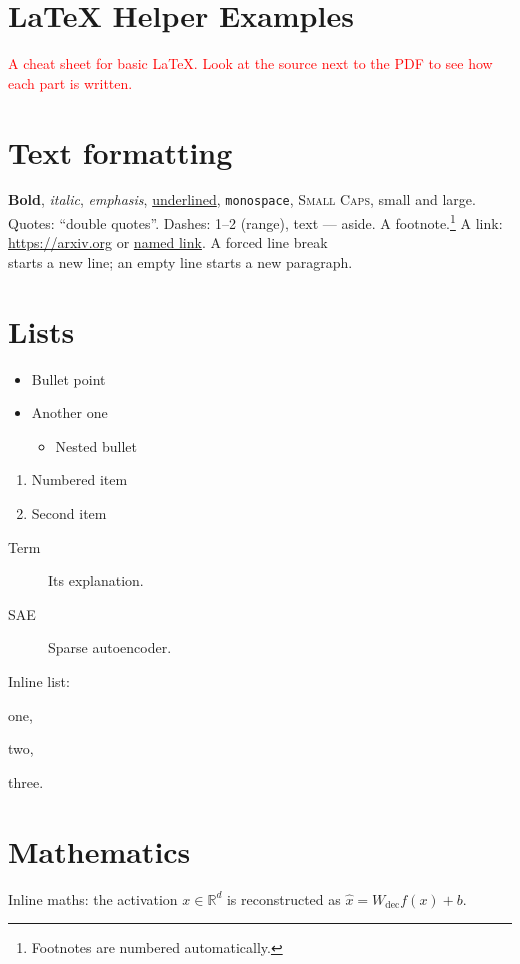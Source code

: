 \documentclass[11pt,a4paper]{article}
\begin{document}
\section*{LaTeX Helper Examples}
\textcolor{red}{A cheat sheet for basic \LaTeX. Look at the source next to the
PDF to see how each part is written.}

\section{Text formatting}
\textbf{Bold}, \textit{italic}, \emph{emphasis}, \underline{underlined},
\texttt{monospace}, \textsc{Small Caps}, {\small small} and {\large large}.
Quotes: \enquote{double quotes}. Dashes: 1--2 (range), text --- aside.
A footnote.\footnote{Footnotes are numbered automatically.}
A link: \url{https://arxiv.org} or \href{https://arxiv.org}{named link}.
A forced line break\\ starts a new line; an empty line starts a new paragraph.

\section{Lists}
\begin{itemize}
  \item Bullet point
  \item Another one
  \begin{itemize}
    \item Nested bullet
  \end{itemize}
\end{itemize}

\begin{enumerate}
  \item Numbered item
  \item Second item
\end{enumerate}

\begin{description}
  \item[Term] Its explanation.
  \item[SAE] Sparse autoencoder.
\end{description}

Inline list: \begin{enumerate*}[label=(\roman*)] \item one, \item two,
\item three. \end{enumerate*}

\section{Mathematics}
Inline maths: the activation $x \in \mathbb{R}^d$ is reconstructed as
$\hat{x} = W_{\text{dec}} f(x) + b$.
\end{document}
